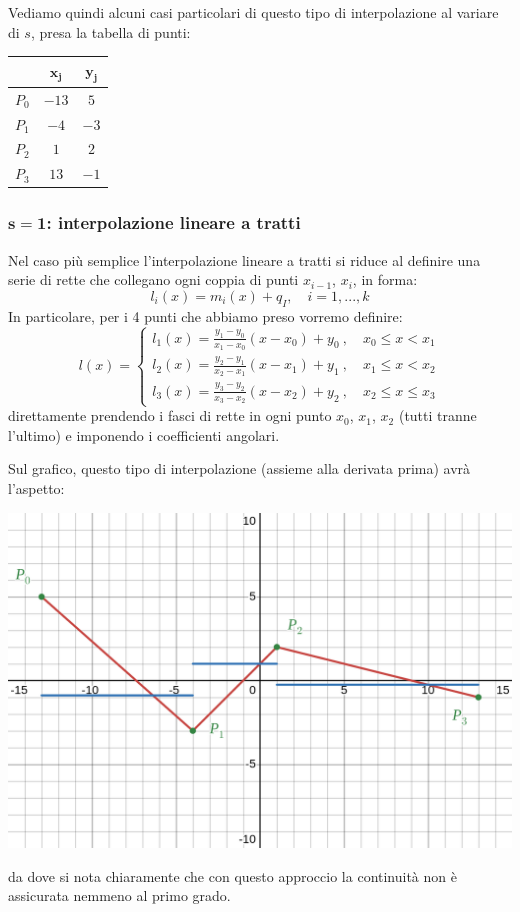 \documentclass[a4paper,11pt]{article}
\begin{document}
\newpage

Vediamo quindi alcuni casi particolari di questo tipo di interpolazione al variare di $s$, presa la tabella di punti: 
\begin{table}[h!]
	\center 
	\begin{tabular} { c | c c }
		& $\mathbf{x_j}$ & $\mathbf{y_j}$ \\
		\hline
		$P_0$ & $-13$ & $5$ \\ 
		$P_1$ & $-4$ & $-3$ \\ 
		$P_2$ & $1$ & $2$ \\ 
		$P_3$ & $13$ & $-1$
	\end{tabular}
\end{table}

\subsubsection{$\mathbf{s = 1}$: interpolazione lineare a tratti}
Nel caso più semplice l'interpolazione lineare a tratti si riduce al definire una serie di rette che collegano ogni coppia di punti $x_{i - 1}$, $x_{i}$, in forma:
$$
l_i(x) = m_i(x)+ q_I, \quad i = 1, ..., k 
$$
In particolare, per i 4 punti che abbiamo preso vorremo definire:
\[
	l(x) = 
	\begin{cases}
		l_{1}\left(x\right)=\frac{y_{1}-y_{0}}{x_{1}-x_{0}}\left(x-x_{0}\right)+y_{0}\ , \quad x_{0}\le x < x_{1} \\
		l_{2}\left(x\right)=\frac{y_{2}-y_{1}}{x_{2}-x_{1}}\left(x-x_{1}\right)+y_{1}\ , \quad x_{1}\le x < x_{2} \\
		l_{3}\left(x\right)=\frac{y_{3}-y_{2}}{x_{3}-x_{2}}\left(x-x_{2}\right)+y_{2}\ , \quad x_{2}\le x\le x_{3}
	\end{cases}
\]
direttamente prendendo i fasci di rette in ogni punto $x_0$, $x_1$, $x_2$ (tutti tranne l'ultimo) e imponendo i coefficienti angolari.

Sul grafico, questo tipo di interpolazione (assieme alla derivata prima) avrà l'aspetto:
\begin{center}
	\includegraphics[scale=0.3]{../figures/multipoly_1.png}
\end{center}
da dove si nota chiaramente che con questo approccio la continuità non è assicurata nemmeno al primo grado.
\end{document}
